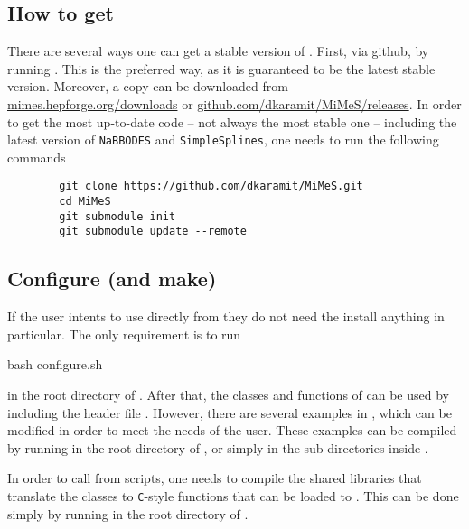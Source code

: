 \documentclass[a4paper,11pt]{article}
\begin{document}
	\subsection{How to get \mimes}
	There are several ways one can get a stable version of \mimes. First, via github, by running .
	This is the preferred way, as it is guaranteed to be the latest stable version. Moreover, a copy can be downloaded from 
	\href{https://mimes.hepforge.org/downloads}{mimes.hepforge.org/downloads} or \href{https://github.com/dkaramit/MiMeS/releases}{github.com/dkaramit/MiMeS/releases}.
	In order to get the most up-to-date code -- not always the most stable one -- including the latest version of {\tt NaBBODES} and {\tt SimpleSplines}, one needs to run
	the following commands
	\begin{lstlisting}
		git clone https://github.com/dkaramit/MiMeS.git
		cd MiMeS
		git submodule init
		git submodule update --remote
	\end{lstlisting}


	\subsection{Configure (and make)}
	If the user intents to use \mimes directly from \CPP they do not need the install anything in particular. The only requirement is to run 
	\begin{bash}
		bash configure.sh
	\end{bash}
	in the root directory of \mimes. After that, the classes and functions of \mimes can be used by including the header file .
	However, there are several examples in , which can be modified in order to meet the needs of the user. These examples can be 
	compiled by running   in the root directory of \mimes, or simply  in the sub directories inside .
	
	In order to call \mimes  from \PY scripts, one needs to compile the shared libraries that translate the \CPP classes to {\tt C}-style functions that can be loaded to 
	\PY. This can be done simply by running  in the root directory of \mimes.
	
	
\end{document}
